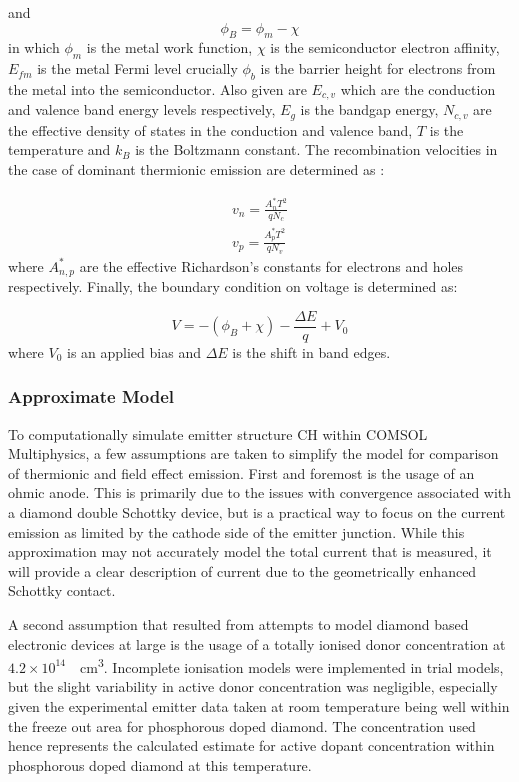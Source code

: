 \begin{refsection}
and
\begin{equation}
    \phi_{B} = \phi_{m}-\chi
\end{equation}
in which $\phi_{m}$ is the metal work function, $\chi$ is the semiconductor electron affinity, $E_{fm}$ is the metal Fermi level crucially $\phi_{b}$ is the barrier height for electrons from the metal into the semiconductor. Also given are $E_{c,v}$ which are the conduction and valence band energy levels respectively, $E_{g}$ is the bandgap energy, $N_{c,v}$ are the effective density of states in the conduction and valence band, $T$ is the temperature and $k_{B}$ is the Boltzmann constant. The recombination velocities in the case of dominant thermionic emission are determined as \cite{Shur1990}:

\begin{align}
    v_{n} = \frac{A^{*}_{n} T^2}{q N_{c}} \\
    v_{p} = \frac{A^{*}_{p} T^2}{q N_{v}}
\end{align}
where $A^{*}_{n,p}$ are the effective Richardson's constants for electrons and holes respectively. Finally, the boundary condition on voltage is determined as:

\begin{equation}
    V = - \left( \phi_{B} + \chi \right) - \frac{\Delta E}{q} + V_{0}
\end{equation}
where $V_{0}$ is an applied bias and $\Delta E$ is the shift in band edges.

\subsubsection{Approximate Model}
To computationally simulate emitter structure CH within COMSOL Multiphysics, a few assumptions are taken to simplify the model for comparison of thermionic and field effect emission. First and foremost is the usage of an ohmic anode. This is primarily due to the issues with convergence associated with a diamond double Schottky device, but is a practical way to focus on the current emission as limited by the cathode side of the emitter junction. While this approximation may not accurately model the total current that is measured, it will provide a clear description of current due to the geometrically enhanced Schottky contact.

A second assumption that resulted from attempts to model diamond based electronic devices at large is the usage of a totally ionised donor concentration at $4.2\times10^{14}$~\si{\per\centi\metre\cubed}. Incomplete ionisation models were implemented in trial models, but the slight variability in active donor concentration was negligible, especially given the experimental emitter data taken at room temperature being well within the freeze out area for phosphorous doped diamond. The concentration used hence represents the calculated estimate for active dopant concentration within phosphorous doped diamond at this temperature.


\end{refsection}
